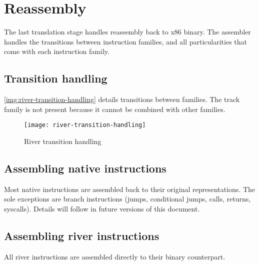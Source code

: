 \documentclass[12pt]{report}
\begin{document}
\section{Reassembly}
\label{sec:reassembly}
The last translation stage handles reassembly back to x86 binary. The assembler handles the transitions between instruction families, and all particularities that come with each instruction family.\\

\subsection{Transition handling}
\autoref{img:river-transition-handling} details transitions between families. The track family is not present because it cannot be combined with other families.\\
\begin{figure}[h]
	\texttt{[image: river-transition-handling]}
	\label{img:river-transition-handling}
	\caption{River transition handling}
\end{figure}

\subsection{Assembling native instructions}
\label{ssec:assembling-native-instructions}
Most native instructions are assembled back to their original representations. The sole exceptions are branch instructions (jumps, conditional jumps, calls, returns, syscalls). Details will follow in future versions of this document.\\

\subsection{Assembling river instructions}
All river instructions are assembled directly to their binary counterpart.\\
\end{document}
